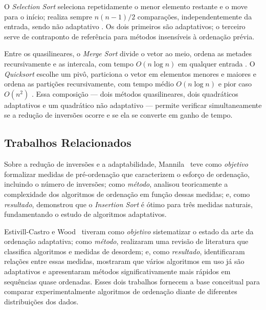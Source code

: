 \documentclass[12pt]{article}
\begin{document}
O \emph{Selection Sort} seleciona repetidamente o menor elemento restante e o move para o início; realiza sempre $n(n-1)/2$ comparações, independentemente da entrada, sendo não adaptativo \cite{estivill-castro_survey_1992}. Os dois primeiros são adaptativos; o terceiro serve de contraponto de referência para métodos insensíveis à ordenação prévia.

Entre os quasilineares, o \emph{Merge Sort} divide o vetor ao meio, ordena as metades recursivamente e as intercala, com tempo $O(n\log n)$ em qualquer entrada \cite{cormen_introduction_2022}. O \emph{Quicksort} escolhe um pivô, particiona o vetor em elementos menores e maiores e ordena as partições recursivamente, com tempo médio $O(n\log n)$ e pior caso $O(n^2)$ \cite{cormen_introduction_2022}. Essa composição --- dois métodos quasilineares, dois quadráticos adaptativos e um quadrático não adaptativo --- permite verificar simultaneamente se a redução de inversões ocorre e se ela se converte em ganho de tempo.

\subsection{Trabalhos Relacionados}\label{sec:relac}

Sobre a redução de inversões e a adaptabilidade, Mannila~\cite{mannila_measures_1984} teve como \emph{objetivo} formalizar medidas de pré-ordenação que caracterizem o esforço de ordenação, incluindo o número de inversões; como \emph{método}, analisou teoricamente a complexidade dos algoritmos de ordenação em função dessas medidas; e, como \emph{resultado}, demonstrou que o \emph{Insertion Sort} é ótimo para três medidas naturais, fundamentando o estudo de algoritmos adaptativos.

Estivill-Castro e Wood~\cite{estivill-castro_survey_1992} tiveram como \emph{objetivo} sistematizar o estado da arte da ordenação adaptativa; como \emph{método}, realizaram uma revisão de literatura que classifica algoritmos e medidas de desordem; e, como \emph{resultado}, identificaram relações entre essas medidas, mostraram que vários algoritmos em uso já são adaptativos e apresentaram métodos significativamente mais rápidos em sequências quase ordenadas. Esses dois trabalhos fornecem a base conceitual para comparar experimentalmente algoritmos de ordenação diante de diferentes distribuições dos dados.
\end{document}
